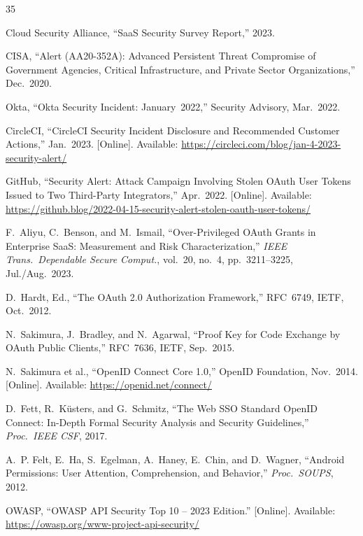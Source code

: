 \documentclass[conference]{IEEEtran}
\begin{document}
\begin{thebibliography}{35}

Cloud Security Alliance, ``SaaS Security Survey Report,'' 2023.

CISA, ``Alert (AA20-352A): Advanced Persistent Threat Compromise of
Government Agencies, Critical Infrastructure, and Private Sector
Organizations,'' Dec.~2020.

Okta, ``Okta Security Incident: January~2022,'' Security Advisory,
Mar.~2022.

CircleCI, ``CircleCI Security Incident Disclosure and Recommended
Customer Actions,'' Jan.~2023. [Online]. Available:
\url{https://circleci.com/blog/jan-4-2023-security-alert/}

GitHub, ``Security Alert: Attack Campaign Involving Stolen OAuth
User Tokens Issued to Two Third-Party Integrators,'' Apr.~2022.
[Online]. Available:
\url{https://github.blog/2022-04-15-security-alert-stolen-oauth-user-tokens/}

F.~Aliyu, C.~Benson, and M.~Ismail, ``Over-Privileged OAuth Grants
in Enterprise SaaS: Measurement and Risk Characterization,''
\textit{IEEE Trans.\ Dependable Secure Comput.}, vol.~20, no.~4,
pp.~3211--3225, Jul./Aug.~2023.

D.~Hardt, Ed., ``The OAuth 2.0 Authorization Framework,'' RFC~6749,
IETF, Oct.~2012.

N.~Sakimura, J.~Bradley, and N.~Agarwal, ``Proof Key for Code
Exchange by OAuth Public Clients,'' RFC~7636, IETF, Sep.~2015.

N.~Sakimura et al., ``OpenID Connect Core 1.0,'' OpenID Foundation,
Nov.~2014. [Online]. Available: \url{https://openid.net/connect/}

D.~Fett, R.~K\"{u}sters, and G.~Schmitz, ``The Web SSO Standard
OpenID Connect: In-Depth Formal Security Analysis and Security
Guidelines,'' \textit{Proc.\ IEEE CSF}, 2017.

A.~P. Felt, E.~Ha, S.~Egelman, A.~Haney, E.~Chin, and D.~Wagner,
``Android Permissions: User Attention, Comprehension, and Behavior,''
\textit{Proc.\ SOUPS}, 2012.

OWASP, ``OWASP API Security Top 10 -- 2023 Edition.'' [Online].
Available: \url{https://owasp.org/www-project-api-security/}


\end{thebibliography}
\end{document}
